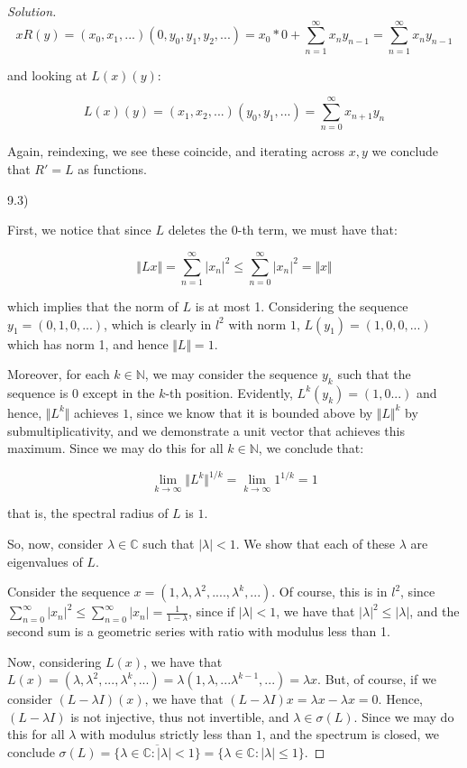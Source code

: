 \documentclass[10pt]{article}
\begin{document}
\begin{proof}[Solution]
$$ x R(y) =(x_0,x_1,...)(0,y_0,y_1,y_2,...) = x_0 * 0 +  \sum_{n=1}^\infty x_n y_{n-1} = \sum_{n=1}^\infty x_n y_{n-1} $$

and looking at $L(x)(y)$:

$$ L(x)(y) = (x_1,x_2,...)(y_0,y_1,...) = \sum_{n=0}^\infty x_{n+1}y_n $$

Again, reindexing, we see these coincide, and iterating across $x, y$ we conclude that $R' = L$ as functions.

9.3)

First, we notice that since $L$ deletes the $0$-th term, we must have that:

$$ \Vert Lx \Vert = \sum_{n=1}^\infty | x_n|^2 \leq \sum_{n=0}^\infty |x_n|^2 = \Vert x \Vert$$

which implies that the norm of $L$ is at most 1. Considering the sequence $y_1 = (0,1,0,...)$, which is clearly in $l^2$ with norm $1$, $L(y_1) = (1,0,0,...)$ which has norm 1, and hence $\Vert L \Vert = 1$.

Moreover, for each $k \in \mathbb{N}$, we may consider the sequence $y_k$ such that the sequence is $0$ except in the $k$-th position. Evidently, $L^k(y_k) = (1,0...)$ and hence, $\Vert L^k \Vert$ achieves $1$, since we know that it is bounded above by $\Vert L\Vert^k$ by submultiplicativity, and we demonstrate a unit vector that achieves this maximum. Since we may do this for all $k \in \mathbb{N}$, we conclude that:

$$ \lim_{k \to \infty} \Vert L^k \Vert^{1/k} = \lim_{k \to \infty} 1^{1/k} = 1$$

that is, the spectral radius of $L$ is $1$.

So, now, consider $\lambda \in \mathbb{C}$ such that $|\lambda | < 1$. We show that each of these $\lambda$ are eigenvalues of $L$.

Consider the sequence $x = (1, \lambda, \lambda^2,...., \lambda^k,...)$. Of course, this is in $l^2$, since $\sum_{n=0}^\infty | x_n|^2 \leq \sum_{n=0}^\infty |x_n| = \frac{1}{1 - \lambda}$, since if $|\lambda| < 1$, we have that $|\lambda|^2 \leq |\lambda|$, and the second sum is a geometric series with ratio with modulus less than 1.

Now, considering $L(x)$, we have that $L(x) = (\lambda, \lambda^2,...,\lambda^{k},...) = \lambda( 1, \lambda, ... \lambda^{k-1},...) = \lambda x$. But, of course, if we consider $(L - \lambda I )(x)$, we have that $(L - \lambda I)x = \lambda x - \lambda x = 0$. Hence, $(L - \lambda I)$ is not injective, thus not invertible, and $\lambda \in \sigma(L)$. Since we may do this for all $\lambda$ with modulus strictly less than $1$, and the spectrum is closed, we conclude $\sigma(L) = \overline{\{ \lambda \in \mathbb{C} : |\lambda| < 1 \}} = \{ \lambda \in \mathbb{C} : |\lambda | \leq 1 \}$.


\end{proof}
\end{document}
